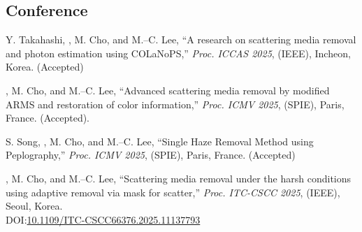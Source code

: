 \documentclass[a4paper,9pt]{extarticle}
\begin{document}
\subsection*{Conference}
\begin{enumerate}[label={[\arabic*]}, start=1]
    
    \item 
    Y. Takahashi, , M. Cho, and M.--C. Lee, 
    ``A research on scattering media removal and photon estimation using COLaNoPS,''
    \textit{Proc. ICCAS 2025}, (IEEE),
    Incheon, Korea. 
    (Accepted)

    \item 
    , M. Cho, and M.--C. Lee, 
    ``Advanced scattering media removal by modified ARMS and restoration of color information,'' 
    \textit{Proc. ICMV 2025}, (SPIE),
    Paris, France. 
    (Accepted).
        
    \item 
    S. Song, , M. Cho, and M.--C. Lee, 
    ``Single Haze Removal Method using Peplography,'' 
    \textit{Proc. ICMV 2025}, (SPIE),
    Paris, France. 
    (Accepted)

    \item 
    , M. Cho, and M.--C. Lee, 
    ``Scattering media removal under the harsh conditions using adaptive removal via mask for scatter,'' 
    \textit{Proc. ITC-CSCC 2025}, (IEEE),
    Seoul, Korea. \\
    DOI:\href{https://doi.org/10.1109/ITC-CSCC66376.2025.11137793}{10.1109/ITC-CSCC66376.2025.11137793}
    

\end{enumerate}
\end{document}
